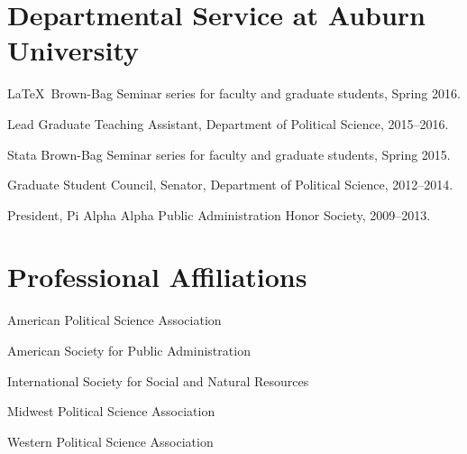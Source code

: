 \documentclass[11pt,letterpaper]{article}
\renewenvironment{itemize}{
  \begin{list}{}{
    \setlength{\leftmargin}{1.5em}
    \setlength{\itemsep}{0.25em}
    \setlength{\parskip}{0pt}
    \setlength{\parsep}{0.25em}
  }
}{
  \end{list}
}
\begin{document}
\section*{Departmental Service at Auburn University}
	\begin{itemize}
		\item \LaTeX~Brown-Bag Seminar series for faculty and graduate students, Spring 2016.
		\item Lead Graduate Teaching Assistant, Department of Political Science, 2015--2016.
		\item Stata Brown-Bag Seminar series for faculty and graduate students, Spring 2015.
		\item Graduate Student Council, Senator, Department of Political Science, 2012--2014.
		\item President, Pi Alpha Alpha Public Administration Honor Society, 2009--2013.
	\end{itemize}

\section*{Professional Affiliations}
\begin{itemize}
	\item American Political Science Association
	\item American Society for Public Administration
	\item International Society for Social and Natural Resources
	\item Midwest Political Science Association
	\item Western Political Science Association
\end{itemize}

\end{document}
